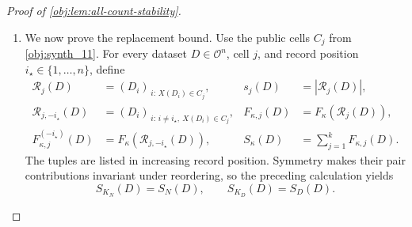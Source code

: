 \documentclass[11pt]{article}
\begin{document}
\begin{proof}[Proof of \cref{obj:lem:all-count-stability}]
\begin{enumerate}
The unit bounds on the kernels imply
\[
\left|\sum_{i<i'}\kappa(o_i,o_{i'})\right|
\le\sum_{i<i'}|\kappa(o_i,o_{i'})|
\le\binom{s}{2},
\qquad
|F_\kappa(\mathscr R)|\le s.
\]
For \(s\ge2\), separating the pairs involving an appended record \(o\in\mathcal O\) gives the exact identity
\[
F_\kappa(o_1,\ldots,o_s,o)-F_\kappa(o_1,\ldots,o_s)
=
\frac2s\sum_{i=1}^s\kappa(o_i,o)
-\frac{F_\kappa(o_1,\ldots,o_s)}s.
\]
Consequently,
\[
\begin{aligned}
\left|F_\kappa(o_1,\ldots,o_s,o)-F_\kappa(o_1,\ldots,o_s)\right|
&\le\frac2s\left|\sum_{i=1}^s\kappa(o_i,o)\right|
+\frac{|F_\kappa(o_1,\ldots,o_s)|}{s}\\
&\le\frac2s\,s+\frac{s}{s}=3.
\end{aligned}
\]
For the remaining occupancies, the defining formulas give
\[
F_\kappa(o)-F_\kappa(\varnothing)=0,
\qquad
F_\kappa(o_1,o)-F_\kappa(o_1)=2\kappa(o_1,o),
\]
so the respective absolute increments are zero and at most \(2\le3\). Thus, at every occupancy, each scalar insertion increment is at most \(3\), and the sum of the two absolute insertion increments is at most \(6\).

\item We now prove the replacement bound. Use the public cells \(C_j\) from \cref{obj:synth_11}. For every dataset \(D\in\mathcal O^n\), cell \(j\), and record position \(i_\star\in\{1,\ldots,n\}\), define
\[
\begin{aligned}
\mathscr R_j(D)&=(D_i)_{\,i:\,X(D_i)\in C_j},
&
s_j(D)&=|\mathscr R_j(D)|,\\
\mathscr R_{j,-i_\star}(D)
&=(D_i)_{\,i:\,i\ne i_\star,\ X(D_i)\in C_j},
&
F_{\kappa,j}(D)&=F_\kappa(\mathscr R_j(D)),\\
F_{\kappa,j}^{(-i_\star)}(D)
&=F_\kappa(\mathscr R_{j,-i_\star}(D)),
&
S_\kappa(D)&=\sum_{j=1}^kF_{\kappa,j}(D).
\end{aligned}
\]
The tuples are listed in increasing record position. Symmetry makes their pair contributions invariant under reordering, so the preceding calculation yields
\[
S_{K_N}(D)=S_N(D),\qquad S_{K_D}(D)=S_D(D).
\]


\end{enumerate}
\end{proof}
\end{document}
